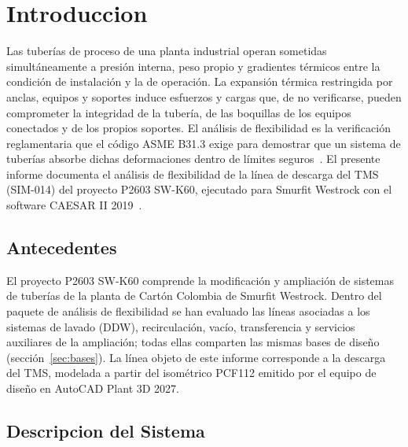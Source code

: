 \section{Introduccion}
\label{sec:intro}

Las tuber\'{i}as de proceso de una planta industrial operan sometidas
simult\'{a}neamente a presi\'{o}n interna, peso propio y gradientes t\'{e}rmicos
entre la condici\'{o}n de instalaci\'{o}n y la de operaci\'{o}n. La expansi\'{o}n
t\'{e}rmica restringida por anclas, equipos y soportes induce esfuerzos y cargas
que, de no verificarse, pueden comprometer la integridad de la tuber\'{i}a, de las
boquillas de los equipos conectados y de los propios soportes. El an\'{a}lisis de
flexibilidad es la verificaci\'{o}n reglamentaria que el c\'{o}digo ASME B31.3
exige para demostrar que un sistema de tuber\'{i}as absorbe dichas deformaciones
dentro de l\'{i}mites seguros~\cite{asme_b313_2016}. El presente informe documenta
el an\'{a}lisis de flexibilidad de la l\'{i}nea de descarga del TMS (SIM-014)
del proyecto P2603 SW-K60, ejecutado para Smurfit Westrock con el software
CAESAR II 2019~\cite{caesar2_ug_2019}.

\subsection{Antecedentes}

El proyecto P2603 SW-K60 comprende la modificaci\'{o}n y ampliaci\'{o}n de
sistemas de tuber\'{i}as de la planta de Cart\'{o}n Colombia de Smurfit Westrock.
Dentro del paquete de an\'{a}lisis de flexibilidad se han evaluado las
l\'{i}neas asociadas a los sistemas de lavado (DDW), recirculaci\'{o}n, vac\'{i}o,
transferencia y servicios auxiliares de la ampliaci\'{o}n; todas ellas comparten
las mismas bases de dise\~{n}o (secci\'{o}n~\ref{sec:bases}). La l\'{i}nea objeto
de este informe corresponde a la descarga del TMS, modelada a partir del
isom\'{e}trico PCF112 emitido por el equipo de dise\~{n}o en AutoCAD Plant
3D 2027.

\subsection{Descripcion del Sistema}

